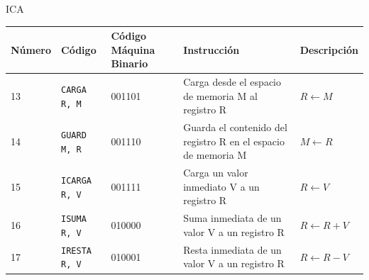 ICA\documentclass{article}
\begin{document}
\begin{longtable}{|p{}|p{}|p{}|p{}|p{}|}
  \hline
  \textbf{Número} & \textbf{Código}      & \textbf{Código Máquina Binario} & \textbf{Instrucción}                                                                                                                                                                          & \textbf{Descripción}                                                                                                \\
  \hline
  13              & \texttt{CARGA R, M}  & 001101                          & Carga desde el espacio de memoria M al registro R                                                                                                                                             & $R \leftarrow M$                                                                                                    \\
  \hline
  14              & \texttt{GUARD M, R}  & 001110                          & Guarda el contenido del registro R en el espacio de memoria M                                                                                                                                 & $M \leftarrow R$                                                                                                    \\
  \hline
  15              & \texttt{ICARGA R, V} & 001111                          & Carga un valor inmediato V a un registro R                                                                                                                                                    & $R \leftarrow V$                                                                                                    \\
  \hline
  16              & \texttt{ISUMA R, V}  & 010000                          & Suma inmediata de un valor V a un registro R                                                                                                                                                  & $R \leftarrow R + V$                                                                                                \\
  \hline
  17              & \texttt{IRESTA R, V} & 010001                          & Resta inmediata de un valor V a un registro R                                                                                                                                                 & $R \leftarrow R - V$                                                                                                \\

\end{longtable}
\end{document}
